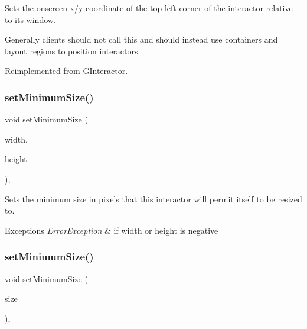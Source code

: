 Sets the onscreen x/y-\/coordinate of the top-\/left corner of the interactor relative to its window. 

Generally clients should not call this and should instead use containers and layout regions to position interactors. 

Reimplemented from \mbox{\hyperlink{classsgl_1_1GInteractor_a04594e8ba9b98513a64f1da00dcae18c}{G\+Interactor}}.

\mbox{\label{classsgl_1_1GInteractor_a0cf428e207b7f22cc08138a90b1b87b2}} 
\subsubsection{\texorpdfstring{set\+Minimum\+Size()}{setMinimumSize()}\hspace{0.1cm}{\footnotesize\ttfamily [1/2]}}
{\footnotesize\ttfamily void set\+Minimum\+Size (\begin{DoxyParamCaption}\item[{double}]{width,  }\item[{double}]{height }\end{DoxyParamCaption})\hspace{0.3cm}{\ttfamily [virtual]}, {\ttfamily [inherited]}}



Sets the minimum size in pixels that this interactor will permit itself to be resized to. 


\begin{DoxyExceptions}{Exceptions}
{\em Error\+Exception} & if width or height is negative \\
\hline
\end{DoxyExceptions}
\mbox{\label{classsgl_1_1GInteractor_a3b1046117ac6cb7abe467e00ba8a81f4}} 
\subsubsection{\texorpdfstring{set\+Minimum\+Size()}{setMinimumSize()}\hspace{0.1cm}{\footnotesize\ttfamily [2/2]}}
{\footnotesize\ttfamily void set\+Minimum\+Size (\begin{DoxyParamCaption}\item[{const \mbox{\hyperlink{structsgl_1_1GDimension}{G\+Dimension}} \&}]{size }\end{DoxyParamCaption})\hspace{0.3cm}{\ttfamily [virtual]}, {\ttfamily [inherited]}}



